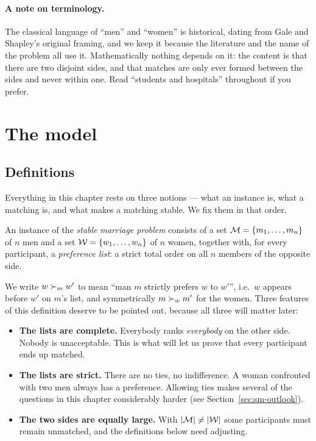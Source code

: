 \paragraph{A note on terminology.}
The classical language of ``men'' and ``women'' is historical, dating from
Gale and Shapley's original framing, and we keep it because the
literature and the name of the problem all use it. Mathematically nothing
depends on it: the content is that there are two disjoint sides, and that
matches are only ever formed between the sides and never within one. Read
``students and hospitals'' throughout if you prefer.

\section{The model}\label{sec:sm-model}

\subsection{Definitions}

Everything in this chapter rests on three notions --- what an instance is,
what a matching is, and what makes a matching stable. We fix them in that
order.

\begin{definition}[Instance]
An instance of the \emph{stable marriage problem} consists of a set
$\mathcal{M} = \{m_1,\dots,m_n\}$ of $n$ men and a set
$\mathcal{W} = \{w_1,\dots,w_n\}$ of $n$ women, together with, for every
participant, a \emph{preference list}: a strict total order on all $n$
members of the opposite side.
\end{definition}

We write $w \succ_{m} w'$ to mean ``man $m$ strictly prefers $w$ to $w'$'',
i.e.\ $w$ appears before $w'$ on $m$'s list, and symmetrically $m \succ_{w} m'$
for the women. Three features of this definition deserve to be pointed out,
because all three will matter later:

\begin{itemize}
  \item \textbf{The lists are complete.} Everybody ranks \emph{everybody} on
        the other side. Nobody is unacceptable. This is what will let us prove
        that every participant ends up matched.
  \item \textbf{The lists are strict.} There are no ties, no indifference.
        A woman confronted with two men always has a preference. Allowing ties
        makes several of the questions in this chapter considerably harder
        (see Section~\ref{sec:sm-outlook}).
  \item \textbf{The two sides are equally large.} With $|\mathcal{M}| \neq |\mathcal{W}|$
        some participants must remain unmatched, and the definitions below need
        adjusting.
\end{itemize}

